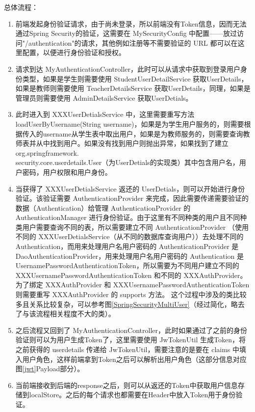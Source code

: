 总体流程：

\begin{enumerate}[label=\circled{\arabic*}]
  \item 前端发起身份验证请求，由于尚未登录，所以前端没有Token信息，因而无法通过Spring Security的验证，这需要在 MySecurityConfig 中配置——放过访问"/authentication"的请求，其他例如注册等不需要验证的 URL 都可以在这里配置，以便进行身份验证和授权。
  \item 请求到达 MyAuthenticationController，此时可以从请求中获取到登录用户身份类型，如果是学生则需要使用 StudentUserDetailService 获取UserDetails，如果是教师则需要使用 TeacherDetailsService 获取UserDetails，同理，如果是管理员则需要使用 AdminDetailsService 获取UserDetials。
  \item 此时进入到 XXXUserDetialsService 中，这里需要重写方法 loadUserByUsername(String username)，如果是为学生用户服务的，则需要根据传入的username从学生表中取出用户，如果是为教师服务的，则需要查询教师表并从中找到用户。如果没有找到用户则抛出异常，如果找到了建立 org.springframework.\\security.core.userdetails.User（为UserDetials的实现类）其中包含用户名，用户密码，用户权限和用户身份。
  \item 当获得了 XXXUserDetialsService 返还的 UserDetials，则可以开始进行身份验证。该验证需要 AuthenticationProvider 来完成，因此需要传递需要验证的数据（Authentication）给管理 AuthenticationProvider 的 AuthenticationManager 进行身份验证。由于这里有不同种类的用户且不同种类用户需要查询不同的表，所以需要建立不同 AuthenticationProvider （使用不同的 XXXUserDetialsService（从不同的数据库查询用户））去处理不同的 Authentication，而用来处理用户名用户密码的 AuthenticationProvider 是 DaoAuthenticationProvider，用来处理用户名用户密码的 Authentication 是 UsernamePasswordAuthenticationToken，所以需要为不同用户建立不同的 XXXUsernamePasswordAuthenticationToken 和不同的 XXXAuthProvider。为了绑定 XXXAuthProvider 和 XXXUsernamePasswordAuthenticationToken 则需要重写 XXXAuthProvider 的 supports 方法。
        这个过程中涉及的类比较多且关系比较复杂，可以参考图\ref{SpringSecurityMultiUser}（经过简化，略去了与该流程相关程度不大的类）。
  \item 之后流程又回到了 MyAuthenticationController，此时如果通过了之前的身份验证则可以为用户生成Token了，这里需要使用 JwTokenUtil 生成Token，将 之前获得的 userdetails 传递给 JwTokenUtil，需要注意的是要在 claims 中填入用户角色，这样前端拿到Token之后可以解析出用户角色（这部分信息对应图\ref{jwt}Payload部分）。
  \item 当前端接收到后端的response之后，则可以从返还的Token中获取用户信息存储到localStore。之后的每个请求也都需要在Header中放入Token用于身份验证。
\end{enumerate}

